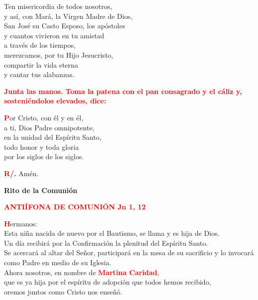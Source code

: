 \documentclass[12pt, letterpaper]{report}
\begin{document}
Ten misericordia de todos nosotros,\\
y as\'i, con Mar\'a, la Virgen Madre de Dios,\\
San Jos\'e su Casto Esposo, los ap\'ostoles\\
y cuantos vivieron en tu amistad\\
a trav\'es de los tiempos,\\
merezcamos, por tu Hijo Jesucristo,\\
compartir la vida eterna\\
y cantar tus alabanzas. \newline

\newpage


\large{\bfseries \textcolor{red}{Junta las manos. Toma la patena con el pan consagrado y el c\'aliz y, sosteni\'endolos elevados, dice:}}

\lettrine[lines=1]{\bfseries \textcolor{red}{P}}{}\Large or Cristo, con \'el y en \'el,\\
a ti, Dios Padre omnipotente,\\
en la unidad del Esp\'iritu Santo,\\
todo honor y toda gloria\\
por los siglos de los siglos.\newline

\Large \hspace{-0.9cm} {\bfseries \textcolor{red}{R/.}} \hspace{0.5cm} Am\'en.


\begin{center}
\Huge {\bfseries Rito de la Comuni\'on}
\end{center}

\Large {\bfseries \textcolor{red}{ANTI\'IFONA DE COMUNI\'ON \hspace{2cm} Jn 1, 12}}

\lettrine[lines=1]{\bfseries \textcolor{red}{H}}{}\Large ermanos: \\
Esta ni\~na nacida de nuevo por el Bautismo, se llama y es hija de Dios. \\
Un d\'ia recibir\'a por la Confirmaci\'on la plenitud del Esp\'iritu Santo. \\
Se acercar\'a al altar del Se\~nor, participar\'a en la mesa de su sacrificio y lo invocar\'a como Padre en medio de su Iglesia. \\
Ahora nosotros, en nombre de {\bfseries \textcolor{red}{Martina Caridad}}, \\
que es ya hija por el esp\'iritu de adopci\'on que todos hemos recibido, \\
oremos juntos como Cristo nos ense\~n\'o. \newline
\end{document}
